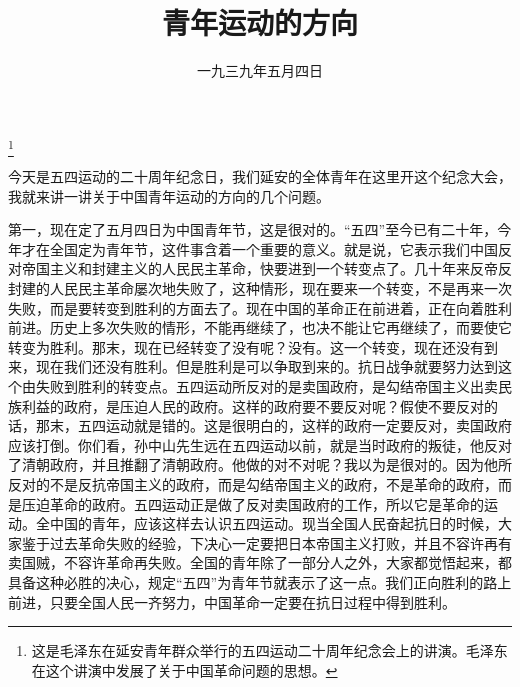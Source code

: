 
\title{青年运动的方向}
\date{一九三九年五月四日}
\thanks{这是毛泽东在延安青年群众举行的五四运动二十周年纪念会上的讲演。毛泽东在这个讲演中发展了关于中国革命问题的思想。}
\maketitle


今天是五四运动的二十周年纪念日，我们延安的全体青年在这里开这个纪念大会，我就来讲一讲关于中国青年运动的方向的几个问题。

第一，现在定了五月四日为中国青年节，这是很对的。“五四”至今已有二十年，今年才在全国定为青年节，这件事含着一个重要的意义。就是说，它表示我们中国反对帝国主义和封建主义的人民民主革命，快要进到一个转变点了。几十年来反帝反封建的人民民主革命屡次地失败了，这种情形，现在要来一个转变，不是再来一次失败，而是要转变到胜利的方面去了。现在中国的革命正在前进着，正在向着胜利前进。历史上多次失败的情形，不能再继续了，也决不能让它再继续了，而要使它转变为胜利。那末，现在已经转变了没有呢？没有。这一个转变，现在还没有到来，现在我们还没有胜利。但是胜利是可以争取到来的。抗日战争就要努力达到这个由失败到胜利的转变点。五四运动所反对的是卖国政府，是勾结帝国主义出卖民族利益的政府，是压迫人民的政府。这样的政府要不要反对呢？假使不要反对的话，那末，五四运动就是错的。这是很明白的，这样的政府一定要反对，卖国政府应该打倒。你们看，孙中山先生远在五四运动以前，就是当时政府的叛徒，他反对了清朝政府，并且推翻了清朝政府。他做的对不对呢？我以为是很对的。因为他所反对的不是反抗帝国主义的政府，而是勾结帝国主义的政府，不是革命的政府，而是压迫革命的政府。五四运动正是做了反对卖国政府的工作，所以它是革命的运动。全中国的青年，应该这样去认识五四运动。现当全国人民奋起抗日的时候，大家鉴于过去革命失败的经验，下决心一定要把日本帝国主义打败，并且不容许再有卖国贼，不容许革命再失败。全国的青年除了一部分人之外，大家都觉悟起来，都具备这种必胜的决心，规定“五四”为青年节就表示了这一点。我们正向胜利的路上前进，只要全国人民一齐努力，中国革命一定要在抗日过程中得到胜利。

